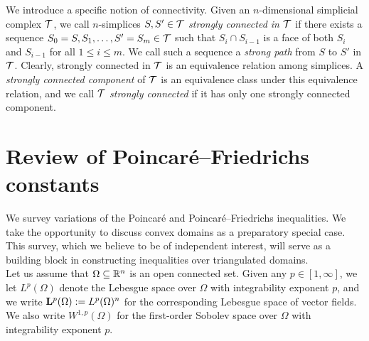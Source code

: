 \documentclass[10pt,letterpaper]{article}
\begin{document}
We introduce a specific notion of connectivity. 
Given an $n$-dimensional simplicial complex ${\mathcal T}$, 
we call $n$-simplices $S,S' \in {\mathcal T}$ \emph{strongly connected in ${\mathcal T}$} if there exists a sequence $S_0=S,S_1,\dots,S'=S_m \in {\mathcal T}$ such that $S_{i} \cap S_{i-1}$ is a face of both $S_{i}$ and $S_{i-1}$ for all $1 \leq i \leq m$. 
We call such a sequence a \emph{strong path} from $S$ to $S'$ in ${\mathcal T}$. 
Clearly, strongly connected in ${\mathcal T}$ is an equivalence relation among simplices. 
A \emph{strongly connected component} of ${\mathcal T}$ is an equivalence class under this equivalence relation, 
and we call ${\mathcal T}$ \emph{strongly connected} if it has only one strongly connected component. 











































\section{Review of Poincar\'e--Friedrichs constants}\label{section:poincare}

We survey variations of the Poincar\'e and Poincar\'e--Friedrichs inequalities. 
We take the opportunity to discuss convex domains as a preparatory special case.
This survey, which we believe to be of independent interest, will serve as a building block in constructing inequalities over triangulated domains.
\\

Let us assume that $\Omega \subseteq {\mathbb R}^{n}$ is an open connected set. 
Given any $p \in [1,\infty]$, we let $L^{p}(\Omega)$ denote the Lebesgue space over $\Omega$ with integrability exponent $p$, and we write ${\mathbf L}^{p}(\Omega) := L^{p}(\Omega)^{n}$ for the corresponding Lebesgue space of vector fields. 
We also write $W^{1,p}(\Omega)$ for the first-order Sobolev space over $\Omega$ with integrability exponent $p$. 
\end{document}
